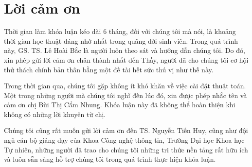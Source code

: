 \chapter*{Lời cảm ơn}
\label{thanks}

Thời gian làm khóa luận kéo dài 6 tháng, đối với chúng tôi mà nói, là khoảng thời gian học thuật đáng nhớ nhất trong quãng đời sinh viên. Trong quá trình này, GS. TS. Lê Hoài Bắc là người luôn theo sát và hướng dẫn chúng tôi. Do đó, xin phép gửi lời cảm ơn chân thành nhất đến Thầy, người đã cho chúng tôi cơ hội thử thách chính bản thân bằng một đề tài hết sức thú vị như thế này.

Trong thời gian qua, chúng tôi gặp không ít khó khăn về việc cài đặt thuật toán. Một trong những người mà chúng tôi nghĩ đến lúc đó, xin được phép nhắc tên và cảm ơn chị Bùi Thị Cẩm Nhung. Khóa luận này đã không thể hoàn thiện khi không có những lời khuyên từ chị.

Chúng tôi cũng rất muốn gửi lời cảm ơn đến TS. Nguyễn Tiến Huy, cũng như đội ngũ cán bộ giảng dạy của Khoa Công nghệ thông tin, Trường Đại học Khoa học Tự nhiên, những người đã trao cho chúng tôi những tri thức nền tảng rất hữu ích và luôn sẵn sàng hỗ trợ chúng tôi trong quá trình thực hiện khóa luận.




